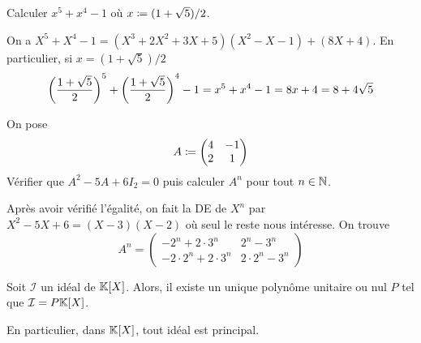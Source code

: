 \documentclass{magnolia}
\begin{document}
  \begin{exos}
  \exo Calculer $x^5+x^4-1$ où $x\coloneqq(1+\sqrt{5})/2$.
    \begin{sol}
    On a $X^5+X^4-1=(X^3+2X^2+3X+5)(X^2-X-1)+(8X+4)$. En particulier,
    si $x=(1+\sqrt{5})/2$
    \[\left(\frac{1+\sqrt{5}}{2}\right)^5+\left(\frac{1+\sqrt{5}}{2}\right)^4-1=x^5+x^4-1=8x+4=
      8+4\sqrt{5}\]  
    \end{sol}
    
      \exo On pose
      \[A\coloneqq
      \begin{pmatrix}
      4 & -1\\
      2 & 1
      \end{pmatrix}\]
      Vérifier que $A^2-5A+6I_2=0$ puis calculer $A^n$ pour tout $n\in\mathbb{N}$.
      \begin{sol}
      Après avoir vérifié l'égalité, on fait la DE de $X^n$ par $X^2-5X+6=(X-3)(X-2)$ où seul le reste nous intéresse.
      On trouve
      \[A^n=
      \begin{pmatrix}
      -2^n+2\cdot 3^n & 2^n-3^n\\
      -2\cdot 2^n+2\cdot 3^n & 2\cdot 2^n-3^n
      \end{pmatrix}\]
      \end{sol}
  \end{exos}

\begin{proposition}
Soit $\mathcal{I}$ un idéal de $\polyK$. Alors, il existe un unique polynôme unitaire
ou nul $P$ tel que $\mathcal{I}=P\polyK$.
\end{proposition}

\begin{remarqueUnique}
\remarque En particulier, dans $\polyK$, tout idéal est principal.
\end{remarqueUnique}
\end{document}
